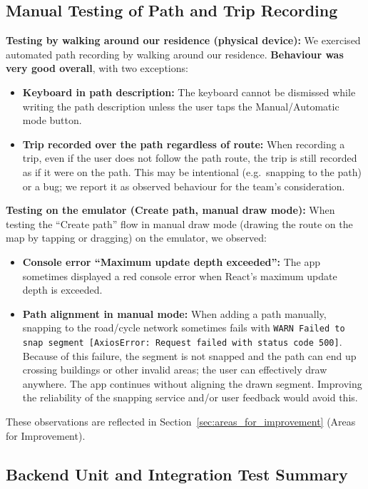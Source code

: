 \subsection{Manual Testing of Path and Trip Recording}
\label{subsec:manual_path_trip_results}

\textbf{Testing by walking around our residence (physical device):}
We exercised automated path recording by walking around our residence. \textbf{Behaviour was very good overall}, with two exceptions:
\begin{itemize}
    \item \textbf{Keyboard in path description:} The keyboard cannot be dismissed while writing the path description unless the user taps the Manual/Automatic mode button.
    \item \textbf{Trip recorded over the path regardless of route:} When recording a trip, even if the user does not follow the path route, the trip is still recorded as if it were on the path. This may be intentional (e.g.\ snapping to the path) or a bug; we report it as observed behaviour for the team's consideration.
\end{itemize}

\textbf{Testing on the emulator (Create path, manual draw mode):}
When testing the ``Create path'' flow in manual draw mode (drawing the route on the map by tapping or dragging) on the emulator, we observed:
\begin{itemize}
    \item \textbf{Console error ``Maximum update depth exceeded'':} The app sometimes displayed a red console error when React's maximum update depth is exceeded.
    \item \textbf{Path alignment in manual mode:} When adding a path manually, snapping to the road/cycle network sometimes fails with \texttt{WARN Failed to snap segment [AxiosError: Request failed with status code 500]}. Because of this failure, the segment is not snapped and the path can end up crossing buildings or other invalid areas; the user can effectively draw anywhere. The app continues without aligning the drawn segment. Improving the reliability of the snapping service and/or user feedback would avoid this.
\end{itemize}
These observations are reflected in Section~\ref{sec:areas_for_improvement} (Areas for Improvement).

\subsection{Backend Unit and Integration Test Summary}
\label{subsec:backend_test_summary}

